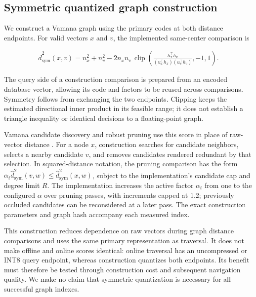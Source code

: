 \subsection{Symmetric quantized graph construction}

We construct a Vamana graph using the primary codes at both distance endpoints. For valid vectors $x$ and $v$, the implemented same-center comparison is

\begin{equation}
\begin{gathered}
\widehat d_{\mathrm{sym}}^2(x,v)=n_x^2+n_v^2-2n_xn_v\,
\operatorname{clip}\!\left(\frac{h_x^\top h_v}{(u_x^\top h_x)(u_v^\top h_v)},-1,1\right).
\end{gathered}
\end{equation}

The query side of a construction comparison is prepared from an encoded database vector, allowing its code and factors to be reused across comparisons. Symmetry follows from exchanging the two endpoints. Clipping keeps the estimated directional inner product in its feasible range; it does not establish a triangle inequality or identical decisions to a floating-point graph.

Vamana candidate discovery and robust pruning use this score in place of raw-vector distance \cite{diskann}. For a node $x$, construction searches for candidate neighbors, selects a nearby candidate $v$, and removes candidates rendered redundant by that selection. In squared-distance notation, the pruning comparison has the form $\alpha_t\widehat d_{\mathrm{sym}}^2(v,w)\leq\widehat d_{\mathrm{sym}}^2(x,w)$, subject to the implementation's candidate cap and degree limit $R$. The implementation increases the active factor $\alpha_t$ from one to the configured $\alpha$ over pruning passes, with increments capped at 1.2; previously occluded candidates can be reconsidered at a later pass. The exact construction parameters and graph hash accompany each measured index.

This construction reduces dependence on raw vectors during graph distance comparisons and uses the same primary representation as traversal. It does not make offline and online scores identical: online traversal has an uncompressed or INT8 query endpoint, whereas construction quantizes both endpoints. Its benefit must therefore be tested through construction cost and subsequent navigation quality. We make no claim that symmetric quantization is necessary for all successful graph indexes.


